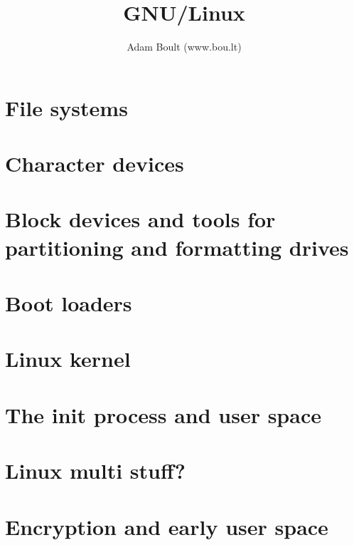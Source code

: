 \documentclass[oneside]{book}
\begin{document}
\author{Adam Boult (www.bou.lt)}
\title{GNU/Linux}
\maketitle

\setcounter{tocdepth}{0}
\tableofcontents



\part{File systems}




\part{Character devices}



\part{Block devices and tools for partitioning and formatting drives}



\part{Boot loaders}



\part{Linux kernel}



\part{The init process and user space}





\part{Linux multi stuff?}




\part{Encryption and early user space}



\end{document}
